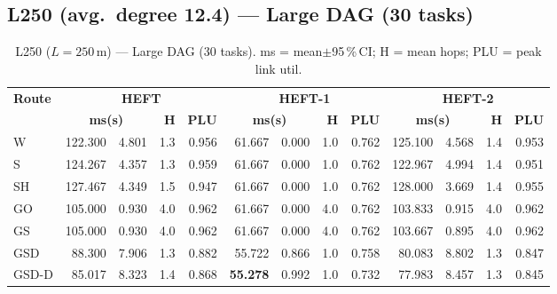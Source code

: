 \documentclass[11pt]{article}
\newcommand{\win}[1]{\textcolor{green!50!black}{\textbf{#1}}}
\newcommand{\bad}[1]{\textcolor{red!70!black}{#1}}
\begin{document}
\subsection{L250 (avg.\ degree 12.4) --- Large DAG (30 tasks)}
\begin{table}[H]\centering\small
\begin{tabular}{l r@{$\pm$}l r r r@{$\pm$}l r r r@{$\pm$}l r r}
\toprule
\textbf{Route} & \multicolumn{4}{c}{\textbf{HEFT}} & \multicolumn{4}{c}{\textbf{HEFT-1}} & \multicolumn{4}{c}{\textbf{HEFT-2}} \\
\cmidrule(lr){2-5}\cmidrule(lr){6-9}\cmidrule(lr){10-13}
& \multicolumn{2}{c}{\textbf{ms(s)}} & \textbf{H} & \textbf{PLU}& \multicolumn{2}{c}{\textbf{ms(s)}} & \textbf{H} & \textbf{PLU}& \multicolumn{2}{c}{\textbf{ms(s)}} & \textbf{H} & \textbf{PLU} \\
\midrule
  W & 122.300 & 4.801 & 1.3 & 0.956 & \bad{61.667} & 0.000 & 1.0 & 0.762 & 125.100 & 4.568 & 1.4 & 0.953 \\
  S & 124.267 & 4.357 & 1.3 & 0.959 & \bad{61.667} & 0.000 & 1.0 & 0.762 & 122.967 & 4.994 & 1.4 & 0.951 \\
  SH & \bad{127.467} & 4.349 & 1.5 & 0.947 & \bad{61.667} & 0.000 & 1.0 & 0.762 & \bad{128.000} & 3.669 & 1.4 & 0.955 \\
  GO & 105.000 & 0.930 & 4.0 & 0.962 & \bad{61.667} & 0.000 & 4.0 & 0.762 & 103.833 & 0.915 & 4.0 & 0.962 \\
  GS & 105.000 & 0.930 & 4.0 & 0.962 & \bad{61.667} & 0.000 & 4.0 & 0.762 & 103.667 & 0.895 & 4.0 & 0.962 \\
  GSD & 88.300 & 7.906 & 1.3 & 0.882 & 55.722 & 0.866 & 1.0 & 0.758 & 80.083 & 8.802 & 1.3 & 0.847 \\
  GSD-D & 85.017 & 8.323 & 1.4 & 0.868 & \win{55.278} & 0.992 & 1.0 & 0.732 & 77.983 & 8.457 & 1.3 & 0.845 \\
\bottomrule\end{tabular}
\caption{L250 ($L=250$\,m) --- Large DAG (30 tasks). ms = mean$\pm$95\,\%\,CI; H = mean hops; PLU = peak link util.}
\end{table}
\end{document}
